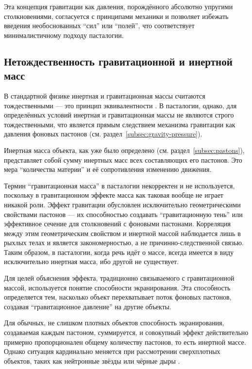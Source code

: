 \documentclass[pdflatex,sn-mathphys-num,referee]{sn-jnl}
\begin{document}
Эта концепция гравитации как давления, порождённого абсолютно упругими столкновениями, согласуется с принципами механики и позволяет избежать введения необоснованных ``сил'' или ``полей'', что соответствует минималистичному подходу пасталогии.

\subsection{Нетождественность гравитационной и инертной масс}\label{subsec:mass-nonequivalence}

В стандартной физике инертная и гравитационная массы считаются тождественными --- это принцип эквивалентности \cite{einstein1920-relativity}. В пасталогии, однако, для определённых условий инертная и гравитационная массы не являются строго тождественными, что является прямым следствием механизма гравитации как давления фоновых пастонов (см. раздел~\ref{subsec:gravity-pressure}).

Инертная масса объекта, как уже было определено (см. раздел~\ref{subsec:pastons}), представляет собой сумму инертных масс всех составляющих его пастонов. Это мера ``количества материи'' и её сопротивления изменению движения.

Термин ``гравитационная масса'' в пасталогии некорректен и не используется, поскольку в гравитационном эффекте масса как таковая вообще не играет никакой роли. Эффект гравитации обусловлен исключительно геометрическими свойствами пастонов --- их способностью создавать ``гравитационную тень'' или эффективное сечение для столкновений с фоновыми пастонами. Корреляция между этим геометрическим свойством и инертной массой наблюдается лишь в рыхлых телах и является закономерностью, а не причинно-следственной связью. Таким образом, в пасталогии, когда речь идёт о массе, всегда имеется в виду исключительно инертная масса, ибо другой не существует.

Для целей объяснения эффекта, традиционно связываемого с гравитационной массой, используется понятие способности экранирования. Эта способность определяется тем, насколько объект перехватывает поток фоновых пастонов, создавая ``гравитационное давление'' на другие объекты.

Для обычных, не слишком плотных объектов способность экранирования, создаваемая каждым пастоном, суммируется, и совокупный эффект действительно примерно пропорционален общему количеству пастонов, то есть инертной массе. Однако ситуация кардинально меняется при рассмотрении сверхплотных объектов, таких как нейтронные звёзды или чёрные дыры \cite{shapiro-teukolsky1983}.
\end{document}
